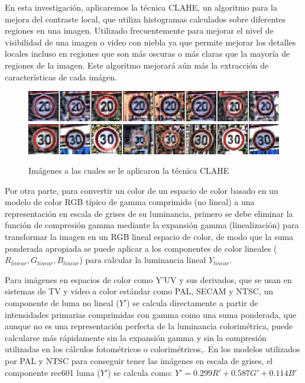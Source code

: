 		En esta investigación, aplicaremos la técnica CLAHE, un algoritmo para la mejora del contraste local, que utiliza histogramas calculados sobre diferentes regiones en una imagen. Utilizado frecuentemente para mejorar el nivel de visibilidad de una imagen o video con niebla ya que permite mejorar los detalles locales incluso en regiones que son más oscuras o más claras que la mayoría de regiones de la imagen. Este algoritmo mejorará aún más la extracción de características de cada imágen.\citep{CLAHE}

			\begin{figure}[H]
			\includegraphics[width=1\textwidth]{images/desarrollo/Normalization_Processing/norm_test1}
			\includegraphics[width=1\textwidth]{images/desarrollo/Normalization_Processing/norm_test2}
			\begin{center}
			\caption{\small{Imágenes a las cuales se le aplicaron la técnica CLAHE }}
			
			{\small{\fontsize{10}{16.8}\selectfont {Fuente: Elaboración propia}}}
			\end{center}
			\vspace{-1.5em}
			\end{figure}
		
		Por otra parte, para convertir un color de un espacio de color basado en un modelo de color RGB típico de gamma comprimido (no lineal) a una representación en escala de grises de su luminancia, primero se debe eliminar la función de compresión gamma mediante la expansión gamma (linealización) para transformar la imagen en un RGB lineal espacio de color, de modo que la suma ponderada apropiada se puede aplicar a los componentes de color lineales ($R_{linear} , G_{linear} , B_{linear}$) para calcular la luminancia lineal $Y_{linear}$.

		Para imágenes en espacios de color como Y'UV y sus derivados, que se usan en sistemas de TV y video a color estándar como PAL, SECAM y NTSC, un componente de luma no lineal ($Y'$) se calcula directamente a partir de intensidades primarias comprimidas con gamma como una suma ponderada, que aunque no es una representación perfecta de la luminancia colorimétrica, puede calcularse más rápidamente sin la expansión gamma y sin la compresión utilizadas en los cálculos fotométricos o colorimétricos,\citep{POYNTON2003257}. En los modelos utilizados por PAL y NTSC para conseguir tener las imágenes en escala de grises, el componente rec601 luma ($Y'$) se calcula como: \begingroup\makeatletter\def\f@size{14.8}\check@mathfonts	$Y' = 0.299R' + 0.587G' +0.114B'$ \endgroup

